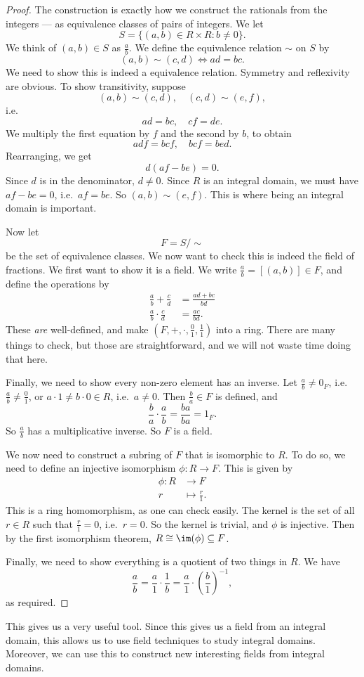 \documentclass[a4paper]{article}
\begin{document}
\begin{proof}
  The construction is exactly how we construct the rationals from the integers --- as equivalence classes of pairs of integers. We let
  \[
    S = \{(a, b) \in R \times R: b \not= 0\}.
  \]
  We think of $(a, b) \in S$ as $\frac{a}{b}$. We define the equivalence relation $\sim$ on $S$ by
  \[
    (a, b) \sim (c, d) \Leftrightarrow ad = bc.
  \]
  We need to show this is indeed a equivalence relation. Symmetry and reflexivity are obvious. To show transitivity, suppose
  \[
    (a, b) \sim (c, d),\quad (c, d) \sim (e, f),
  \]
  i.e.
  \[
    ad = bc,\quad cf = de.
  \]
  We multiply the first equation by $f$ and the second by $b$, to obtain
  \[
    adf = bcf,\quad bcf = bed.
  \]
  Rearranging, we get
  \[
    d(af - be) = 0.
  \]
  Since $d$ is in the denominator, $d \not= 0$. Since $R$ is an integral domain, we must have $af - be = 0$, i.e.\ $af = be$. So $(a, b) \sim (e, f)$. This is where being an integral domain is important.

  Now let
  \[
    F = S/{\sim}
  \]
  be the set of equivalence classes. We now want to check this is indeed the field of fractions. We first want to show it is a field. We write $\frac{a}{b} = [(a, b)] \in F$, and define the operations by
  \begin{align*}
    \frac{a}{b} + \frac{c}{d} &= \frac{ad + bc}{bd}\\
    \frac{a}{b}\cdot \frac{c}{d} &= \frac{ac}{bd}.
  \end{align*}
  These \emph{are} well-defined, and make $(F, +, \cdot, \frac{0}{1}, \frac{1}{1})$ into a ring. There are many things to check, but those are straightforward, and we will not waste time doing that here.

  Finally, we need to show every non-zero element has an inverse. Let $\frac{a}{b} \not= 0_F$, i.e.\ $\frac{a}{b} \not= \frac{0}{1}$, or $a\cdot 1 \not= b \cdot 0 \in R$, i.e.\ $a \not= 0$. Then $\frac{b}{a} \in F$ is defined, and
  \[
    \frac{b}{a} \cdot \frac{a}{b} = \frac{ba}{ba} = 1_F.
  \]
  So $\frac{a}{b}$ has a multiplicative inverse. So $F$ is a field.

  We now need to construct a subring of $F$ that is isomorphic to $R$. To do so, we need to define an injective isomorphism $\phi: R \to F$. This is given by
  \begin{align*}
    \phi: R &\to F\\
    r &\mapsto \frac{r}{1}.
  \end{align*}
  This is a ring homomorphism, as one can check easily. The kernel is the set of all $r \in R$ such that $\frac{r}{1} = 0$, i.e.\ $r = 0$. So the kernel is trivial, and $\phi$ is injective. Then by the first isomorphism theorem, $R \cong \im(\phi) \subseteq F$.

  Finally, we need to show everything is a quotient of two things in $R$. We have
  \[
    \frac{a}{b} = \frac{a}{1} \cdot \frac{1}{b} = \frac{a}{1}\cdot \left(\frac{b}{1}\right)^{-1},
  \]
  as required.
\end{proof}
This gives us a very useful tool. Since this gives us a field from an integral domain, this allows us to use field techniques to study integral domains. Moreover, we can use this to construct new interesting fields from integral domains.
\end{document}
